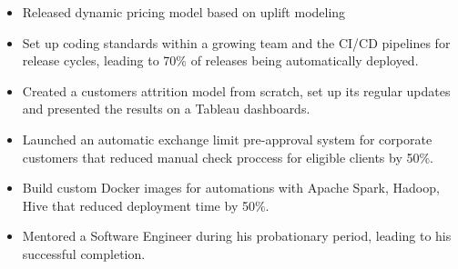 \begin{itemize}
    \item Released dynamic pricing model based on uplift modeling
    \item Set up coding standards within a growing team and the CI/CD pipelines for release cycles, leading to 70\% of releases being automatically deployed.
    \item Created a customers attrition model from scratch, set up its regular updates and presented the results on a Tableau dashboards.
    \item Launched an automatic exchange limit pre-approval system for corporate customers that reduced manual check proccess for eligible clients by 50\%.
    \item Build custom Docker images for automations with Apache Spark, Hadoop, Hive that reduced deployment time by 50\%.
    \item Mentored a Software Engineer during his probationary period, leading to his successful completion.
\end{itemize}
